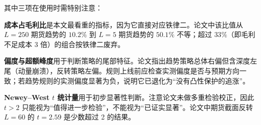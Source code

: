 其中三项在使用时需特别注意：

\textbf{成本占毛利比}是本文最看重的指标，因为它直接对应铁律二。论文中该比值从 $L=250$ 期货趋势的 $10.2\%$ 到 $L=5$ 期货趋势的 $50.1\%$ 不等；超过 $33\%$（即毛利不足成本 3 倍）的组合按铁律二废弃。

\textbf{偏度与超额峰度}用于判断策略的尾部特征。论文指出趋势策略总体右偏但含深度左尾（动量崩溃），反转策略左偏。规则上线前应检查实测偏度是否与预期方向一致；若趋势规则的实测偏度显著为负，说明它已退化为“没有凸性保护的追涨”。

\textbf{Newey--West $t$ 统计量}用于初步显著性判断。注意论文未做多重检验校正，因此 $t>2$ 只能视为“值得进一步检验”，不能视为“已证实显著”。论文中期货截面反转 $L=60$ 的 $t=2.59$ 是少数超过 2 的结果。

